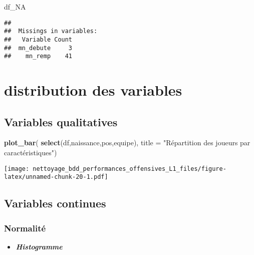 \documentclass[7pt,]{report}
\newenvironment{Shaded}{\begin{snugshade}}{\end{snugshade}}
\newcommand{\DataTypeTok}[1]{\textcolor[rgb]{0.13,0.29,0.53}{#1}}
\newcommand{\KeywordTok}[1]{\textcolor[rgb]{0.13,0.29,0.53}{\textbf{#1}}}
\newcommand{\NormalTok}[1]{#1}
\newcommand{\OperatorTok}[1]{\textcolor[rgb]{0.81,0.36,0.00}{\textbf{#1}}}
\newcommand{\StringTok}[1]{\textcolor[rgb]{0.31,0.60,0.02}{#1}}
\providecommand{\tightlist}{%
  \setlength{\itemsep}{0pt}\setlength{\parskip}{0pt}}
\begin{document}
\begin{Shaded}
\begin{Highlighting}[]
\NormalTok{df_NA}
\end{Highlighting}
\end{Shaded}

\begin{verbatim}
## 
##  Missings in variables:
##   Variable Count
##  mn_debute     3
##    mn_remp    41
\end{verbatim}

\hypertarget{distribution-des-variables}{%
\section{distribution des variables}\label{distribution-des-variables}}

\hypertarget{variables-qualitatives}{%
\subsection{Variables qualitatives}\label{variables-qualitatives}}

\begin{Shaded}
\begin{Highlighting}[]
\KeywordTok{plot_bar}\NormalTok{(}
  \KeywordTok{select}\NormalTok{(df,naissance,pos,equipe),}
  \DataTypeTok{title =} \StringTok{"Répartition des joueurs par caractéristiques"}\NormalTok{)}
\end{Highlighting}
\end{Shaded}

\texttt{[image: nettoyage\_bdd\_performances\_offensives\_L1\_files/figure-latex/unnamed-chunk-20-1.pdf]}

\hypertarget{variables-continues}{%
\subsection{Variables continues}\label{variables-continues}}

\hypertarget{normalituxe9}{%
\subsubsection{Normalité}\label{normalituxe9}}

\begin{itemize}
\tightlist
\item
  \textbf{\emph{Histogramme}}
\end{itemize}

\begin{Shaded}
\end{Shaded}
\end{document}
